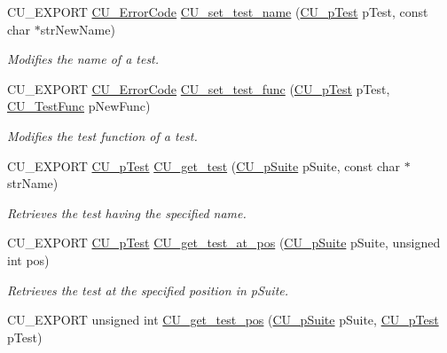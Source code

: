 \begin{DoxyCompactItemize}
C\-U\-\_\-\-E\-X\-P\-O\-R\-T \hyperlink{group__Framework_ga743a2a025ee3eb792d7d85f0eea347e6}{C\-U\-\_\-\-Error\-Code} \hyperlink{group__Framework_ga89cfc3a676106ec0d9e3792ff9afd474}{C\-U\-\_\-set\-\_\-test\-\_\-name} (\hyperlink{group__Framework_ga249c43fbe4e53452b3f90db1437da04b}{C\-U\-\_\-p\-Test} p\-Test, const char $\ast$str\-New\-Name)
\begin{DoxyCompactList}\small\item\em Modifies the name of a test. \end{DoxyCompactList}\item 
C\-U\-\_\-\-E\-X\-P\-O\-R\-T \hyperlink{group__Framework_ga743a2a025ee3eb792d7d85f0eea347e6}{C\-U\-\_\-\-Error\-Code} \hyperlink{group__Framework_ga95af0004c412611dc99472aa71c86c46}{C\-U\-\_\-set\-\_\-test\-\_\-func} (\hyperlink{group__Framework_ga249c43fbe4e53452b3f90db1437da04b}{C\-U\-\_\-p\-Test} p\-Test, \hyperlink{group__Framework_ga5868148b642b30635b8fe7f095c5b493}{C\-U\-\_\-\-Test\-Func} p\-New\-Func)
\begin{DoxyCompactList}\small\item\em Modifies the test function of a test. \end{DoxyCompactList}\item 
C\-U\-\_\-\-E\-X\-P\-O\-R\-T \hyperlink{group__Framework_ga249c43fbe4e53452b3f90db1437da04b}{C\-U\-\_\-p\-Test} \hyperlink{group__Framework_ga032d257cade342d583d56a1346222d12}{C\-U\-\_\-get\-\_\-test} (\hyperlink{group__Framework_gaba832ae8b235f5e70d6a4ac9c3bb1219}{C\-U\-\_\-p\-Suite} p\-Suite, const char $\ast$str\-Name)
\begin{DoxyCompactList}\small\item\em Retrieves the test having the specified name. \end{DoxyCompactList}\item 
C\-U\-\_\-\-E\-X\-P\-O\-R\-T \hyperlink{group__Framework_ga249c43fbe4e53452b3f90db1437da04b}{C\-U\-\_\-p\-Test} \hyperlink{group__Framework_ga75d44f091f3ab0ec818fa0edfec0d465}{C\-U\-\_\-get\-\_\-test\-\_\-at\-\_\-pos} (\hyperlink{group__Framework_gaba832ae8b235f5e70d6a4ac9c3bb1219}{C\-U\-\_\-p\-Suite} p\-Suite, unsigned int pos)
\begin{DoxyCompactList}\small\item\em Retrieves the test at the specified position in p\-Suite. \end{DoxyCompactList}\item 
C\-U\-\_\-\-E\-X\-P\-O\-R\-T unsigned int \hyperlink{group__Framework_ga30be88922ceec733a8aa7d44ed366170}{C\-U\-\_\-get\-\_\-test\-\_\-pos} (\hyperlink{group__Framework_gaba832ae8b235f5e70d6a4ac9c3bb1219}{C\-U\-\_\-p\-Suite} p\-Suite, \hyperlink{group__Framework_ga249c43fbe4e53452b3f90db1437da04b}{C\-U\-\_\-p\-Test} p\-Test)

\end{DoxyCompactItemize}
